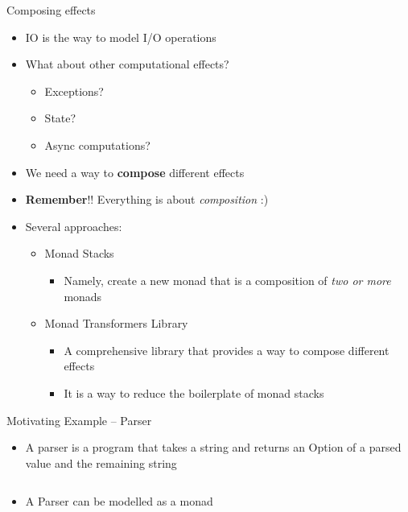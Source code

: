 \documentclass[presentation, 10pt]{beamer}\mode<presentation>{\usetheme{metropolis}}
\begin{document}
\begin{frame}{Composing effects}
\begin{itemize}
	\item IO is the way to model I/O operations
	\item What about other computational effects?
	\begin{itemize}
		\item Exceptions?
		\item State?
		\item Async computations?
	\end{itemize}
	\item We need a way to \textbf{compose} different effects
	\item \textbf{Remember}!! Everything is about \emph{composition} :)
	\item Several approaches:
	\begin{itemize}
		\item Monad Stacks
		\begin{itemize}
			\item Namely, create a new monad that is a composition of \emph{two or more} monads
		\end{itemize}
		\item Monad Transformers Library
		\begin{itemize}
			\item A comprehensive library that provides a way to compose different effects
			\item It is a way to reduce the boilerplate of monad stacks
		\end{itemize}
	\end{itemize}
\end{itemize}
\end{frame}
\begin{frame}[fragile]{Motivating Example -- Parser}
\begin{itemize}
	\item A parser is a program that takes a string and returns an Option of a parsed value and the remaining string
\end{itemize}
\inputminted[firstline=5, lastline=5]{scala}{code/src/main/scala/monads/Parser.scala}
\begin{itemize}
	\item A Parser can be modelled as a monad
\end{itemize}
\inputminted[firstline=7, lastline=17]{scala}{code/src/main/scala/monads/Parser.scala}

\end{frame}
\end{document}
